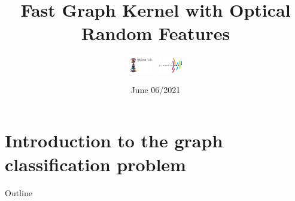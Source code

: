 \documentclass{beamer}
\title[Fast Graph Kernel with Optical Random Features
]{Fast Graph Kernel with Optical Random Features }
\subtitle{\includegraphics[width=1cm]{figs/gipsa-logo.pdf}\hspace*{2cm}~%
    \includegraphics[width=1cm]{figs/logo_inp.png}}
\author[Hashem GHANEM]{Hashem GHANEM \\[1ex]  {\small  Nicolas KERIVEN \and Nicolas TREMBLAY }}
\institute{
IEEE ICASSP 2021
}
\date{June 06/2021}
\begin{document}

\begin{frame}
\titlepage %
\logo{}
\end{frame}


\section{Introduction to the graph classification problem}

\begin{frame}{Outline}
\tiny
\tableofcontents %
\end{frame}
\end{document}
